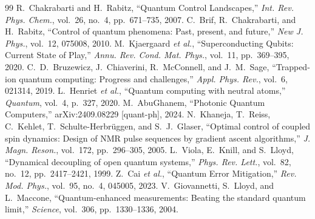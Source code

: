 \documentclass[11pt]{article}
\begin{document}
\begingroup
\setlength{\itemsep}{1ex}
\begin{thebibliography}{99}
 R.~Chakrabarti and H.~Rabitz, ``Quantum Control Landscapes,'' \textit{Int. Rev. Phys. Chem.}, vol.~26, no.~4, pp.~671--735, 2007. %
 C.~Brif, R.~Chakrabarti, and H.~Rabitz, ``Control of quantum phenomena: Past, present, and future,'' \textit{New J. Phys.}, vol.~12, 075008, 2010. %
 M.~Kjaergaard \textit{et al.}, ``Superconducting Qubits: Current State of Play,'' \textit{Annu. Rev. Cond. Mat. Phys.}, vol.~11, pp.~369--395, 2020. %
 C.~D.~Bruzewicz, J.~Chiaverini, R.~McConnell, and J.~M.~Sage, ``Trapped-ion quantum computing: Progress and challenges,'' \textit{Appl. Phys. Rev.}, vol.~6, 021314, 2019. %
 L.~Henriet \textit{et al.}, ``Quantum computing with neutral atoms,'' \textit{Quantum}, vol.~4, p.~327, 2020. %
 M.~AbuGhanem, ``Photonic Quantum Computers,'' arXiv:2409.08229 [quant-ph], 2024. %
 N.~Khaneja, T.~Reiss, C.~Kehlet, T.~Schulte-Herbr\"uggen, and S.~J.~Glaser, ``Optimal control of coupled spin dynamics: Design of NMR pulse sequences by gradient ascent algorithms,'' \textit{J. Magn. Reson.}, vol.~172, pp.~296--305, 2005. %
 L.~Viola, E.~Knill, and S.~Lloyd, ``Dynamical decoupling of open quantum systems,'' \textit{Phys. Rev. Lett.}, vol.~82, no.~12, pp.~2417--2421, 1999. %
 Z.~Cai \textit{et al.}, ``Quantum Error Mitigation,'' \textit{Rev. Mod. Phys.}, vol.~95, no.~4, 045005, 2023. %
 V.~Giovannetti, S.~Lloyd, and L.~Maccone, ``Quantum-enhanced measurements: Beating the standard quantum limit,'' \textit{Science}, vol.~306, pp.~1330--1336, 2004. %
\end{thebibliography}
\endgroup
\end{document}

